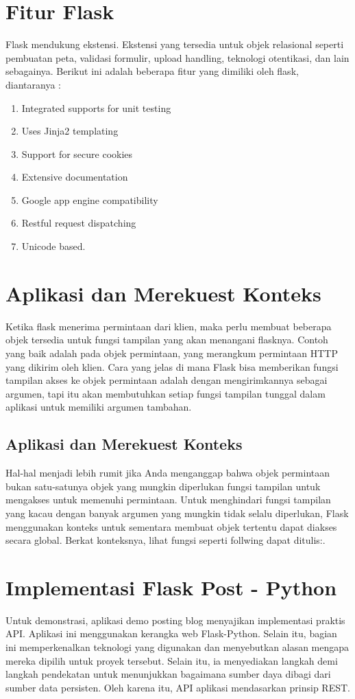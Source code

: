 \section{Fitur Flask}
Flask mendukung ekstensi. Ekstensi yang tersedia untuk objek relasional seperti pembuatan peta,
validasi formulir, upload handling, teknologi otentikasi, dan lain sebagainya. Berikut ini adalah beberapa
fitur yang dimiliki oleh flask, diantaranya :
\begin{enumerate}
  \item Integrated supports for unit testing
  \item Uses Jinja2 templating
  \item Support for secure cookies
  \item Extensive documentation
  \item Google app engine compatibility
  \item Restful request dispatching
  \item Unicode based\cite{lokhande2015efficient}.
\end{enumerate}

\section{Aplikasi dan Merekuest Konteks}
Ketika flask menerima permintaan dari klien, maka perlu membuat beberapa objek tersedia untuk fungsi tampilan yang akan menangani flasknya. Contoh yang baik adalah pada objek permintaan, yang merangkum permintaan HTTP yang dikirim oleh klien. Cara yang jelas di mana Flask bisa memberikan fungsi tampilan akses ke objek permintaan adalah dengan mengirimkannya sebagai argumen, tapi itu akan membutuhkan setiap fungsi tampilan tunggal dalam aplikasi untuk memiliki argumen tambahan\cite{grinberg2018flask}.

\subsection{Aplikasi dan Merekuest Konteks}
Hal-hal menjadi lebih rumit jika Anda menganggap bahwa objek permintaan bukan satu-satunya objek yang mungkin diperlukan fungsi tampilan untuk mengakses untuk memenuhi permintaan. Untuk menghindari fungsi tampilan yang kacau dengan banyak argumen yang mungkin tidak selalu diperlukan, Flask menggunakan konteks untuk sementara membuat objek tertentu dapat diakses secara global. Berkat konteksnya, lihat fungsi seperti follwing dapat ditulis:\cite{grinberg2018flask}.

\section{Implementasi Flask Post - Python}
Untuk demonstrasi, aplikasi demo posting blog menyajikan implementasi praktis API. Aplikasi ini menggunakan kerangka web Flask-Python. Selain itu, bagian ini memperkenalkan teknologi yang digunakan dan menyebutkan alasan mengapa mereka dipilih untuk proyek tersebut. Selain itu, ia menyediakan langkah demi langkah pendekatan untuk menunjukkan bagaimana sumber daya dibagi dari sumber data persisten. Oleh karena itu, API aplikasi mendasarkan prinsip REST\cite{alemu2014rest}.

